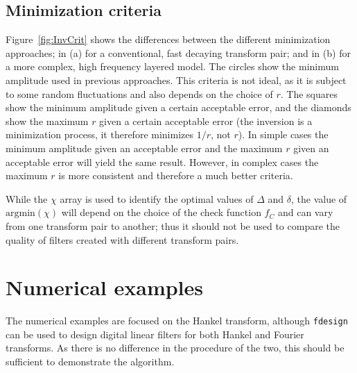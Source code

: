 \documentclass[paper,twocolumn,twoside]{geophysics}
\newcommand{\mr}[1]{\mathrm{#1}}
\begin{document}
\subsection{Minimization criteria}
Figure~\ref{fig:InvCrit} shows the differences between the different
minimization approaches; in (a) for a conventional, fast decaying transform
pair; and in (b) for a more complex, high frequency layered model. The circles
show the minimum amplitude used in previous approaches. This criteria is not
ideal, as it is subject to some random fluctuations and also depends on the
choice of $r$. The squares show the minimum amplitude given a certain
acceptable error, and the diamonds show the maximum $r$ given a certain
acceptable error (the inversion is a minimization process, it therefore
minimizes $1/r$, not $r$). In simple cases the minimum amplitude given an
acceptable error and the maximum $r$ given an acceptable error will yield the
same result. However, in complex cases the maximum $r$ is more consistent and
therefore a much better criteria.
%
%

While the $\chi$ array is used to identify the optimal values of $\Delta$ and
$\delta$, the value of $\mr{argmin}(\chi)$ will depend on the choice of the
check function $f_C$ and can vary from one transform pair to another; thus it
should not be used to compare the quality of filters created with different
transform pairs.


\section{Numerical examples}

The numerical examples are focused on the Hankel transform, although
\texttt{fdesign} can be used to design digital linear filters for both Hankel
and Fourier transforms. As there is no difference in the procedure of the two,
this should be sufficient to demonstrate the algorithm.
\end{document}

